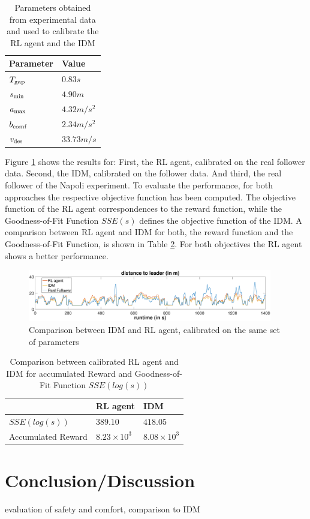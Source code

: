 \documentclass[review]{elsarticle}
\begin{document}
\begin{table}
	\caption{Parameters obtained from experimental data and used to calibrate the RL agent and the IDM} 
	\label{tab:IDMparameters} 
	\begin{center}
		\begin{tabular}{ p{} |p{}  } 
		Parameter & Value   \\ \hline
			$T_{\rm gap}$ & $0.83s$\\
			$s_{\rm min}$ & $4.90m$\\
			$a_{\rm max}$ & $4.32m/s^2$\\
			$b_{\rm comf}$ & $2.34 m/s^2$\\
			$v_{\rm des}$ & $33.73m/s$
			
		\end{tabular}
	\end{center}
\end{table}

Figure \ref{fig:IDMvsRL} shows the results for: First, the RL agent, calibrated on the real follower data. Second, the IDM, calibrated on the follower data. And third, the real follower of the Napoli experiment. To evaluate the performance, for both approaches the respective objective function has been computed. The objective function of the RL agent correspondences to the reward function, while the Goodness-of-Fit Function $SSE(s)$ defines the objective function of the IDM. A comparison between RL agent and IDM for both, the reward function and the Goodness-of-Fit Function, is shown in Table \ref{tab:objectiveFunc}. For both objectives the RL agent shows a better performance.

\begin{figure}
	
	\centering
	\includegraphics[width=0.95\textwidth]{images/IDMvsRL_dist}
	\caption{Comparison between IDM and RL agent, calibrated on the same set of parameters}
	\label{fig:IDMvsRL}
\end{figure}

\begin{table}
	\caption{Comparison between calibrated RL agent and IDM for accumulated Reward and Goodness-of-Fit Function $SSE(log(s))$} 
	\label{tab:objectiveFunc} 
	\begin{center}
		\begin{tabular}{p{} | p{} p{}  } 
			& RL agent & IDM   \\ \hline
			$SSE(log(s))$ & $389.10$ &  $418.05$	\\
			Accumulated Reward &  $8.23 \times 10^3$   & $8.08\times 10^3$
			
		\end{tabular}
	\end{center}
\end{table}


\section{Conclusion/Discussion}
evaluation of safety and comfort, comparison to IDM




\end{document}
